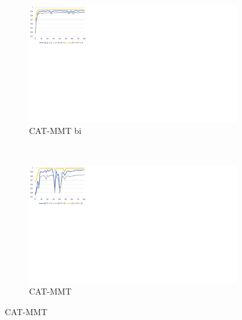 
\begin{figure}[!htbp]
    \centering
    \begin{subfigure}[b]{0.45\textwidth}
      \includegraphics[width=\textwidth]{Img/fig_5_training_cat_mmt_bi.pdf}
      \caption{CAT-MMT bi}
      \label{fig:5_training_cat_mmt_bi}
    \end{subfigure}%
    ~%
    \begin{subfigure}[b]{0.45\textwidth}
      \includegraphics[width=\textwidth]{Img/fig_5_training_cat_mmt.pdf}
      \caption{CAT-MMT}
      \label{fig:5_training_cat_mmt}
    \end{subfigure}
    \label{fig:5_training}
\end{figure}